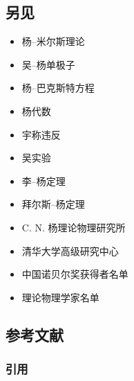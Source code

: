 \subsection{另见}
\begin{itemize}
\item 杨–米尔斯理论
\item 吴–杨单极子
\item 杨–巴克斯特方程
\item 杨代数
\item 宇称违反
\item 吴实验
\item 李–杨定理
\item 拜尔斯–杨定理
\item C. N. 杨理论物理研究所
\item 清华大学高级研究中心
\item 中国诺贝尔奖获得者名单
\item 理论物理学家名单
\end{itemize}
\subsection{参考文献}  
\subsubsection{引用}
